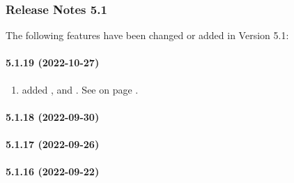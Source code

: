 \subsubsection{Release Notes 5.1}
\label{sec:releasenotes-5-1}
The following features have been changed or added in Version 5.1:\\

\paragraph{5.1.19 (2022-10-27)}  %
\begin{enumerate}
\item added \REASONFUNCTION, \REASONTASK and \REASONGUIUPDATE.
      See  on page \pageref{dia:reasonexpression}.
\end{enumerate}

\paragraph{5.1.18 (2022-09-30)}  %

\paragraph{5.1.17 (2022-09-26)}  %

\paragraph{5.1.16 (2022-09-22)}  %

